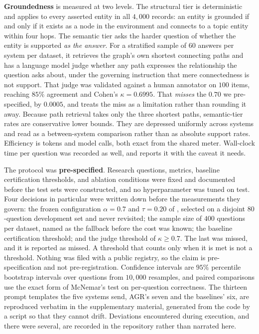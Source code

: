 \textbf{Groundedness} is measured at two levels. The structural tier is
deterministic and applies to every asserted entity in all $4{,}000$
records: an entity is grounded if and only if it exists as a node in the
environment and connects to a topic entity within four hops. The
semantic tier asks the harder question of whether the entity is
supported \emph{as the answer}. For a stratified sample of $60$ answers
per system per dataset, it retrieves the graph's own shortest connecting
paths and has a language model judge whether any path expresses the
relationship the question asks about, under the governing instruction
that mere connectedness is not support. That judge was validated against
a human annotator on $100$ items, reaching $85\%$ agreement and Cohen's
$\kappa = 0.6995$. That \emph{misses} the $0.70$ we pre-specified, by
$0.0005$, and  treats the miss as a limitation
rather than rounding it away. Because path retrieval takes only the
three shortest paths, semantic-tier rates are conservative lower bounds.
They are depressed uniformly across systems and read as a between-system
comparison rather than as absolute support rates. Efficiency is tokens
and model calls, both exact from the shared meter. Wall-clock time per
question was recorded as well, and  reports it with the
caveat it needs.

The protocol was \textbf{pre-specified}. Research questions, metrics,
baseline certification thresholds, and ablation conditions were fixed
and documented before the test sets were constructed, and no
hyperparameter was tuned on test. Four decisions in particular were
written down before the measurements they govern: the frozen
configuration $\alpha = 0.7$ and $\tau = 0.20$ of ,
selected on a disjoint $80$-question development set and never
revisited; the sample size of $400$ questions per dataset, named as the
fallback before the cost was known; the baseline certification
threshold; and the judge threshold of $\kappa \geq 0.7$. The last was
missed, and it is reported as missed. A threshold that counts only when
it is met is not a threshold. Nothing was filed with a public registry,
so the claim is pre-specification and not pre-registration. Confidence
intervals are $95\%$ percentile bootstrap intervals over questions from
$10{,}000$ resamples, and paired comparisons use the exact form of
McNemar's test on per-question correctness. The thirteen prompt
templates the five systems send, AGR's seven and the baselines' six, are
reproduced verbatim in the supplementary material, generated from the
code by a script so that they cannot drift. Deviations encountered
during execution, and there were several, are recorded in the repository
rather than narrated here.
